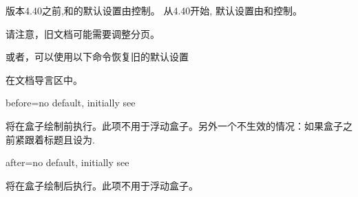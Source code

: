 \begin{marker}

版本4.40之前,和的默认设置由控制。%
从4.40开始, 默认设置由和控制。\par
请注意，旧文档可能需要调整分页。\par
或者，可以使用以下命令恢复旧的默认设置
\begin{dispListing}
\end{dispListing}

在文档导言区中。
\end{marker}

\begin{docTcbKey}{before}{=}{no default, initially see }

将在盒子绘制前执行。此项不用于浮动盒子。另外一个不生效的情况：如果盒子之前紧跟着标题且设为.
\end{docTcbKey}

\begin{docTcbKey}{after}{=}{no default, initially see }

将在盒子绘制后执行。此项不用于浮动盒子。
\end{docTcbKey}


